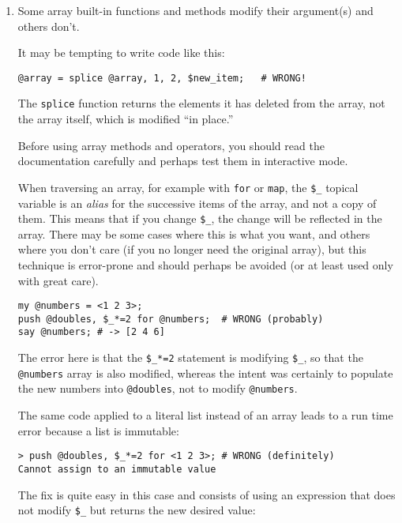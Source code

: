 \begin{enumerate}

\item Some array built-in functions and methods modify 
their argument(s) and others don't.

It may be tempting to write code like this:

\begin{verbatim}
@array = splice @array, 1, 2, $new_item;   # WRONG!
\end{verbatim}

The {\tt splice} function returns the elements it has 
deleted from the array, not the array itself, which 
is modified ``in place.''

Before using array methods and operators, you should 
read the documentation carefully and perhaps test them 
in interactive mode.

When traversing an array, for example with {\tt for} 
or {\tt map}, the \verb'$_' topical variable is an 
\emph{alias} for the successive items of the array, and 
not a copy of them. This means that if you change 
\verb'$_', the change will be reflected in the array. 
There may be some cases where this is what you want, 
and others where you don't care (if you no longer need the 
original array), but this technique is error-prone and 
should perhaps be avoided (or at least used only with 
great care).

\begin{verbatim}
my @numbers = <1 2 3>;
push @doubles, $_*=2 for @numbers;  # WRONG (probably)
say @numbers; # -> [2 4 6]
\end{verbatim}

The error here is that the \verb'$_*=2' statement is 
modifying \verb'$_', so that the \verb'@numbers' array is 
also modified, whereas the intent was certainly to 
populate the new numbers into \verb'@doubles', not 
to modify \verb'@numbers'.

The same code applied to a literal list instead of an 
array leads to a run time error because a list is 
immutable:

\begin{verbatim}
> push @doubles, $_*=2 for <1 2 3>; # WRONG (definitely)
Cannot assign to an immutable value
\end{verbatim}

The fix is quite easy in this case and consists of 
using an expression that does not modify \verb'$_' 
but returns the new desired value:


\end{enumerate}
